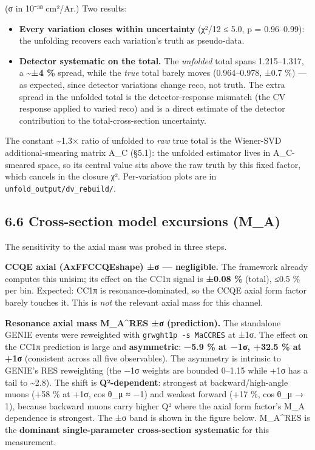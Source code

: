 \documentclass[11pt]{article}
\begin{document}
(σ in 10⁻³⁸ cm²/Ar.) Two results:

\begin{itemize}
\item \textbf{Every variation closes within uncertainty} (χ²/12 ≤ 5.0, p = 0.96–0.99): the unfolding recovers each variation's truth as pseudo-data.
\item \textbf{Detector systematic on the total.} The \emph{unfolded} total spans 1.215–1.317, a \textbf{\textasciitilde{}±4 \%} spread, while the \emph{true} total barely moves (0.964–0.978, ±0.7 \%) — as expected, since detector variations change reco, not truth. The extra spread in the unfolded total is the detector-response mismatch (the CV response applied to varied reco) and is a direct estimate of the detector contribution to the total-cross-section uncertainty.
\end{itemize}

The constant \textasciitilde{}1.3× ratio of unfolded to \emph{raw} true total is the Wiener-SVD additional-smearing matrix A\_C (§5.1): the unfolded estimator lives in A\_C-smeared space, so its central value sits above the raw truth by this fixed factor, which cancels in the closure χ². Per-variation plots are in \texttt{unfold\_output/dv\_rebuild/}.

\subsection*{6.6 Cross-section model excursions (M\_A)}

The sensitivity to the axial mass was probed in three steps.

\textbf{CCQE axial (AxFFCCQEshape) ±σ — negligible.} The framework already computes this unisim; its effect on the CC1π signal is \textbf{±0.08 \%} (total), ≤0.5 \% per bin. Expected: CC1π is resonance-dominated, so the CCQE axial form factor barely touches it. This is \emph{not} the relevant axial mass for this channel.

\textbf{Resonance axial mass M\_A\textasciicircum{}RES ±σ (prediction).} The standalone GENIE events were reweighted with \texttt{grwght1p -s MaCCRES} at ±1σ. The effect on the CC1π prediction is large and \textbf{asymmetric}: \textbf{−5.9 \% at −1σ, +32.5 \% at +1σ} (consistent across all five observables). The asymmetry is intrinsic to GENIE's RES reweighting (the −1σ weights are bounded 0–1.15 while +1σ has a tail to \textasciitilde{}2.8). The shift is \textbf{Q²-dependent}: strongest at backward/high-angle muons (+58 \% at +1σ, cos θ\_μ ≈ −1) and weakest forward (+17 \%, cos θ\_μ → 1), because backward muons carry higher Q² where the axial form factor's M\_A dependence is strongest. The ±σ band is shown in the figure below. M\_A\textasciicircum{}RES is the \textbf{dominant single-parameter cross-section systematic} for this measurement.
\end{document}
